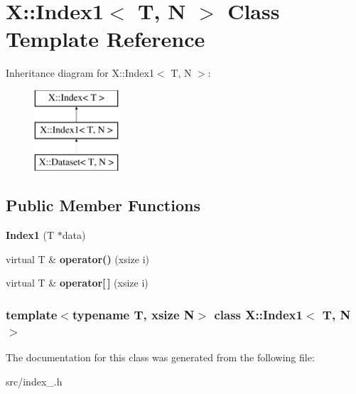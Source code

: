 \hypertarget{class_x_1_1_index1}{\section{X\-:\-:Index1$<$ T, N $>$ Class Template Reference}
\label{class_x_1_1_index1}
}
Inheritance diagram for X\-:\-:Index1$<$ T, N $>$\-:\begin{figure}[H]
\begin{center}
\leavevmode
\includegraphics[height=3.000000cm]{class_x_1_1_index1}
\end{center}
\end{figure}
\subsection*{Public Member Functions}
\begin{DoxyCompactItemize}
\item 
\hypertarget{class_x_1_1_index1_a1a3384046f034e8c7abb66f33e06872d}{{\bfseries Index1} (T $\ast$data)}\label{class_x_1_1_index1_a1a3384046f034e8c7abb66f33e06872d}

\item 
\hypertarget{class_x_1_1_index1_a2d876d68fd4b7248660909862d2fd66b}{virtual T \& {\bfseries operator()} (xsize i)}\label{class_x_1_1_index1_a2d876d68fd4b7248660909862d2fd66b}

\item 
\hypertarget{class_x_1_1_index1_af340b1faa1a33473a9a1f972e1a2f7a1}{virtual T \& {\bfseries operator\mbox{[}$\,$\mbox{]}} (xsize i)}\label{class_x_1_1_index1_af340b1faa1a33473a9a1f972e1a2f7a1}

\end{DoxyCompactItemize}
\subsubsection*{template$<$typename T, xsize N$>$ class X\-::\-Index1$<$ T, N $>$}



The documentation for this class was generated from the following file\-:\begin{DoxyCompactItemize}
\item 
src/index\-\_.\-h\end{DoxyCompactItemize}
